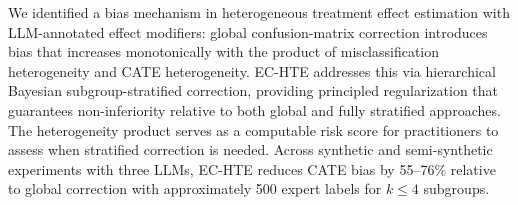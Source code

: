 \documentclass[11pt,a4paper]{article}
\begin{document}
We identified a bias mechanism in heterogeneous treatment effect estimation with LLM-annotated effect modifiers: global confusion-matrix correction introduces bias that increases monotonically with the product of misclassification heterogeneity and CATE heterogeneity.
EC-HTE addresses this via hierarchical Bayesian subgroup-stratified correction, providing principled regularization that guarantees non-inferiority relative to both global and fully stratified approaches.
The heterogeneity product serves as a computable risk score for practitioners to assess when stratified correction is needed.
Across synthetic and semi-synthetic experiments with three LLMs, EC-HTE reduces CATE bias by 55--76\% relative to global correction with approximately 500 expert labels for $k \leq 4$ subgroups.


\end{document}
